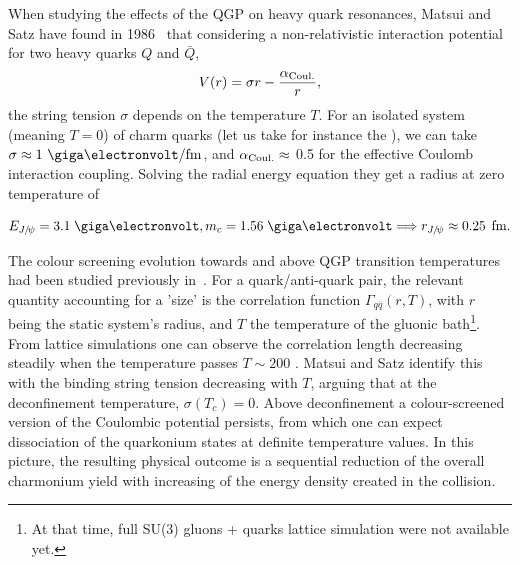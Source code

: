 

When studying the effects of the QGP on heavy quark resonances, Matsui
and Satz have found in 1986~\cite{melting} that considering a
non-relativistic interaction potential for two heavy quarks $Q$ and
$\bar{Q}$,
\begin{equation}
\label{eq:potential}
V(r) = \sigma r - \frac{\alpha_{\rm{Coul.}}}{r},
\end{equation}
the string tension $\sigma$ depends on the temperature $T$. For an
isolated system (meaning $T=0$) of charm quarks (let us take for instance the \Jpsi), %
we can take $\sigma \approx 1~\GeV/ \textrm{fm}$,
and $\alpha_{\rm{Coul.}} \approx$ 0.5 for the effective Coulomb
interaction coupling. Solving the radial energy equation they get a
\Jpsi radius at zero temperature of

\begin{equation}
E_{\Jpsi} = 3.1 \; \GeV, m_{c} =  1.56 \; \GeV \Longrightarrow r_{\Jpsi} \approx 0.25 \; \,\textrm{fm}.
\end{equation}


The colour screening evolution towards and above QGP transition
temperatures had been studied previously in~\cite{DeGrand}. For a
quark/anti-quark pair, the relevant quantity accounting for a 'size'
is the correlation function $\Gamma_{q\bar{q}}(r,T)$, with $r$ being
the static system's radius, and $T$ the temperature of the gluonic
bath\footnote{At that time, full SU(3) gluons + quarks lattice
  simulation were not available yet.}. From lattice simulations one
can observe the correlation length decreasing steadily when the
temperature passes $T\sim 200$ \MeV. Matsui and Satz identify this with
the binding string tension decreasing with $T$, arguing that at the
deconfinement temperature, $\sigma(T_{c}) = 0$. Above deconfinement
a colour-screened version of the Coulombic potential persists, from
which one can expect dissociation of the quarkonium states at definite
temperature values. In this picture, %
the resulting physical outcome is a sequential reduction of the overall charmonium yield with increasing
of the energy density created in the collision. 


